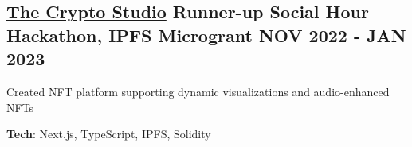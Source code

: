 \documentclass[letter,10pt]{article}
\begin{document}
\subsection{{ \href{https://github.com/Suhel-Kap/the-crypto-studio}{The Crypto Studio} Runner-up Social Hour Hackathon, IPFS Microgrant \hfill NOV 2022 - JAN 2023}}
\begin{zitemize}
  \item Created NFT platform supporting dynamic visualizations and audio-enhanced NFTs
  \item \textbf{Tech}: Next.js, TypeScript, IPFS, Solidity
\end{zitemize}
\end{document}
